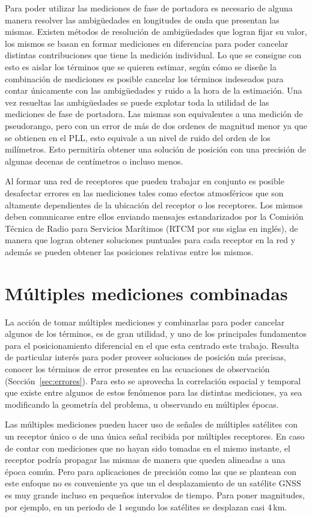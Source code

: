 \documentclass[a4paper,12pt,oneside,onecolumn,final,openright]{book}%
\begin{document}
	Para poder utilizar las mediciones de fase de portadora es necesario de alguna manera resolver las ambigüedades en longitudes de onda que presentan las mismas. Existen métodos de resolución de ambigüedades que logran fijar su valor, los mismos se basan en formar mediciones en diferencias para poder cancelar distintas contribuciones que tiene la medición individual. Lo que se consigue con esto es aislar los términos que se quieren estimar, según cómo se diseñe la combinación de mediciones es posible cancelar los términos indeseados para contar únicamente con las ambigüedades y ruido a la hora de la estimación. Una vez resueltas las ambigüedades se puede explotar toda la utilidad de las mediciones de fase de portadora. Las mismas son equivalentes a una medición de pseudorango, pero con un error de más de dos ordenes de magnitud menor ya que se obtienen en el PLL, esto equivale a un nivel de ruido del orden de los milímetros. Esto permitiría obtener una solución de posición con una precisión de algunas decenas de centímetros o incluso menos. 
	
	 Al formar una red de receptores que pueden trabajar en conjunto es posible desafectar errores en las mediciones tales como efectos atmosféricos que son altamente dependientes de la ubicación del receptor o los receptores.	Los mismos deben comunicarse entre ellos enviando mensajes estandarizados por la Comisión Técnica de Radio para Servicios Marítimos (RTCM por sus siglas en inglés), de manera que logran obtener soluciones puntuales para cada receptor en la red y además se pueden obtener las posiciones relativas entre los mismos.

\section{Múltiples mediciones combinadas}\label{sec:multiples_mediciones}
	La acción de tomar múltiples mediciones y combinarlas para poder cancelar algunos de los términos, es de gran utilidad, y uno de los principales fundamentos para el posicionamiento diferencial en el que esta centrado este trabajo. Resulta de particular interés para poder proveer soluciones de posición más precisas, conocer los términos de error presentes en las ecuaciones de observación (Sección~\ref{sec:errores}). Para esto se aprovecha la correlación espacial y temporal que existe entre algunos de estos fenómenos para las distintas mediciones, ya sea modificando la geometría del problema, u observando en múltiples épocas.
	
	Las múltiples mediciones pueden hacer uso de señales de múltiples satélites con un receptor único o de una única señal recibida por múltiples receptores. En caso de contar con mediciones que no hayan sido tomadas en el mismo instante, el receptor podría propagar las mismas de manera que queden alineadas a una época común. Pero para aplicaciones de precisión como las que se plantean con este enfoque no es conveniente ya que un el desplazamiento de un satélite GNSS es muy grande incluso en pequeños intervalos de tiempo. Para poner magnitudes, por ejemplo, en un periodo de 1 segundo los satélites se desplazan casi 4\,km.
\end{document}

